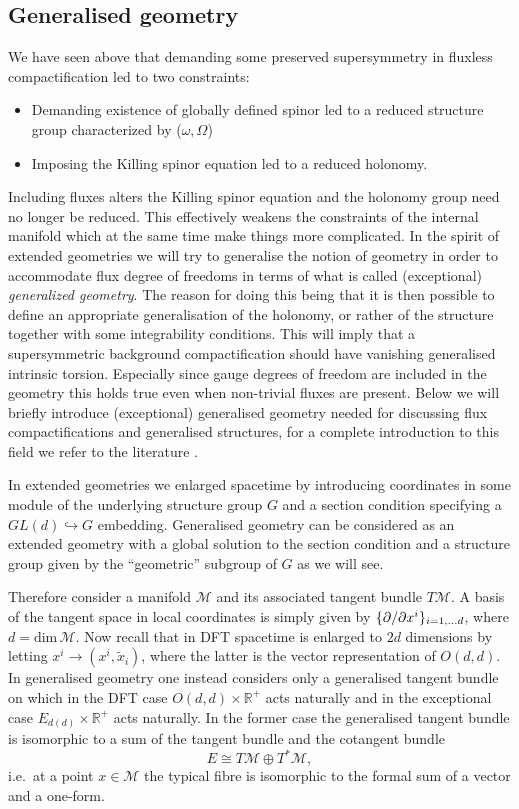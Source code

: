 \subsection{Generalised geometry}
We have seen above that demanding some preserved supersymmetry in fluxless compactification led to two constraints:
\begin{itemize}
    \item Demanding existence of globally defined spinor led to a reduced structure group characterized by ($\omega,\Omega$)
    \item Imposing the Killing spinor equation led to a reduced holonomy. 
\end{itemize}
Including fluxes alters the Killing spinor equation and the holonomy group need no longer be reduced. This effectively weakens the constraints of the internal manifold which at the same time make things more complicated. In the spirit of extended geometries we will try to generalise the notion of geometry in order to accommodate flux degree of freedoms in terms of what is called (exceptional) \emph{generalized geometry}. The reason for doing this being that it is then possible to define an appropriate generalisation of the holonomy, or rather of the structure together with some integrability conditions. This will imply that a supersymmetric background compactification should have vanishing generalised intrinsic torsion. Especially since gauge degrees of freedom are included in the geometry this holds true even when non-trivial fluxes are present. Below we will briefly introduce (exceptional) generalised geometry needed for discussing flux compactifications and generalised structures, for a complete introduction to this field we refer to the literature \cite{Hull:2007zu,Coimbra:2011nw,Coimbra:2011ky,Ntokos:2016vnm}.

In extended geometries we enlarged spacetime by introducing coordinates in some module of the underlying structure group $G$ and a section condition specifying a $GL(d)\hookrightarrow G$ embedding. Generalised geometry can be considered as an extended geometry with a global solution to the section condition and a structure group given by the ``geometric'' subgroup of $G$ as we will see.  

Therefore consider a manifold $\mathcal{M}$ and its associated tangent bundle $T\mathcal{M}$. A basis of the tangent space in local coordinates is simply given by $\{\partial/\partial x^i\}_{i=1,\ldots d}$, where $d=\text{dim}\,\mathcal{M}$. Now recall that in DFT spacetime is enlarged to $2d$ dimensions by letting $x^i\to (x^i,\tilde{x}_i)$, where the latter is the vector representation of $O(d,d)$. In generalised geometry one instead considers only a generalised tangent bundle on which in the DFT case $O(d,d)\times \mathbb{R}^+$ acts naturally and in the exceptional case $E_{d(d)}\times\mathbb{R}^+$ acts naturally.  In the former case the generalised tangent bundle is isomorphic to a sum of the tangent bundle and the cotangent bundle
\begin{equation}\label{eq:GenTangentBundleDef}
E \cong T\mathcal{M}\oplus T^*\mathcal{M},
\end{equation}
i.e.\ at a point $x\in\mathcal{M}$ the typical fibre is isomorphic to the formal sum of a vector and a one-form. 

